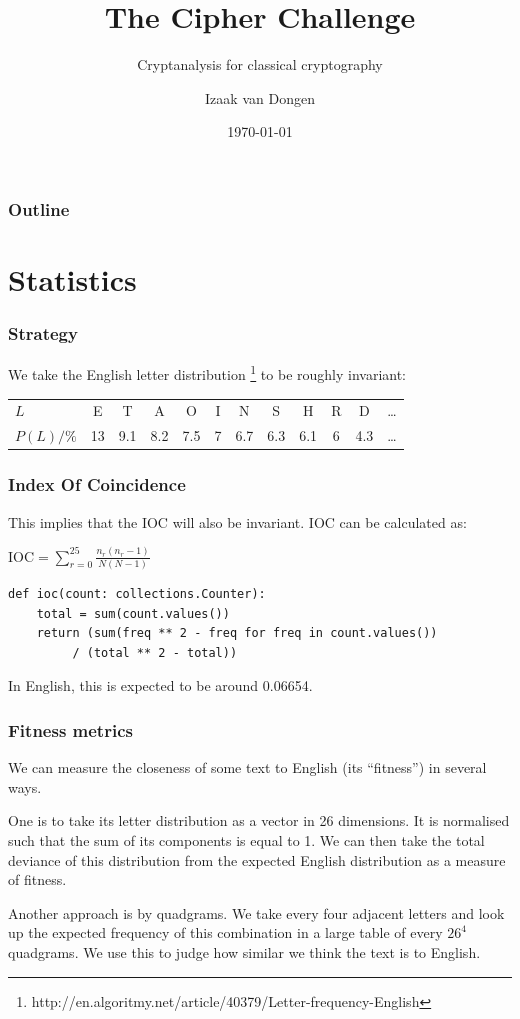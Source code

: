 \documentclass{beamer}
\title{The Cipher Challenge}
\subtitle{Cryptanalysis for classical cryptography}
\author{Izaak van Dongen}
\institute{Hills Road SFC}
\date{\today}
\begin{document}
\begin{frame}
    \titlepage
\end{frame}

\begin{frame}
    \frametitle{Outline}
    \tableofcontents
\end{frame}

\section{Statistics}

\begin{frame}
\frametitle{Strategy}

We take the English letter distribution \footnote{
    http://en.algoritmy.net/article/40379/Letter-frequency-English
} to be roughly invariant:

\begin{tabular}{l|ccccccccccc}
$L$ & E & T & A & O & I & N & S & H & R & D & \ldots \\
$P(L)/\%$ & 13 & 9.1 & 8.2 & 7.5 & 7 & 6.7 & 6.3 & 6.1 & 6 & 4.3 & \ldots\\
\end{tabular}

\end{frame}

\begin{frame}[fragile]
\frametitle{Index Of Coincidence}

This implies that the IOC will also be invariant. IOC can be calculated as:

$\text{IOC} = \sum\limits_{r=0}^{25} \frac{n_r(n_r - 1)}{N(N - 1)}$
\begin{verbatim}
def ioc(count: collections.Counter):
    total = sum(count.values())
    return (sum(freq ** 2 - freq for freq in count.values())
         / (total ** 2 - total))
\end{verbatim}

In English, this is expected to be around 0.06654.

\end{frame}

\begin{frame}
\frametitle{Fitness metrics}

We can measure the closeness of some text to English (its ``fitness'') in
several ways.

One is to take its letter distribution as a vector in 26 dimensions. It is
normalised such that the sum of its components is equal to 1. We can then take
the total deviance of this distribution from the expected English distribution
as a measure of fitness.

Another approach is by quadgrams. We take every four adjacent letters and look
up the expected frequency of this combination in a large table of every $26^4$
quadgrams. We use this to judge how similar we think the text is to English.
\end{frame}
\end{document}
